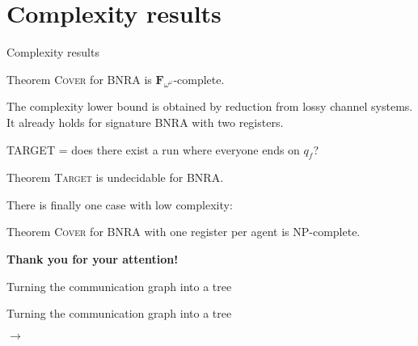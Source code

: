 \documentclass{beamer}
\newcommand{\COVER}{\textsc{Cover}\xspace}
\newcommand{\TARGET}{\textsc{Target}\xspace}
\begin{document}
\section{Complexity results}



\begin{frame}{Complexity results}
	
	\begin{block}{Theorem}
		{\COVER} for BNRA is $\mathbf{F}_{\omega^\omega}$-complete.
	\end{block}
	The complexity lower bound is obtained by reduction from lossy channel systems\footnotemark. It already holds for signature BNRA with two registers.

	\pause
	TARGET = does there exist a run where everyone ends on $q_f$?
	
	\begin{block}{Theorem}
		{\TARGET} is undecidable for BNRA.
	\end{block}

	\pause

	There is finally one case with low complexity:
	\begin{block}{Theorem}
	\COVER{} for BNRA with one register per agent is NP-complete. 
	\end{block}

\end{frame}



\begin{frame}{}
	
	\Huge \textbf{Thank you for your attention!}
	
\end{frame}

\appendix
\begin{frame}
\end{frame}



\begin{frame}{Turning the communication graph into a tree}
\centering

\end{frame}

\begin{frame}{Turning the communication graph into a tree}
\begin{minipage}{0.55\linewidth}
\centering
\resizebox{6.5cm}{!}{

}
\end{minipage}
\begin{minipage}{0.1\linewidth}
$\longrightarrow$
\end{minipage}
\begin{minipage}{0.25 \linewidth}
\resizebox{!}{5cm}{

}
\end{minipage}
\hfill
\end{frame}
\end{document}
